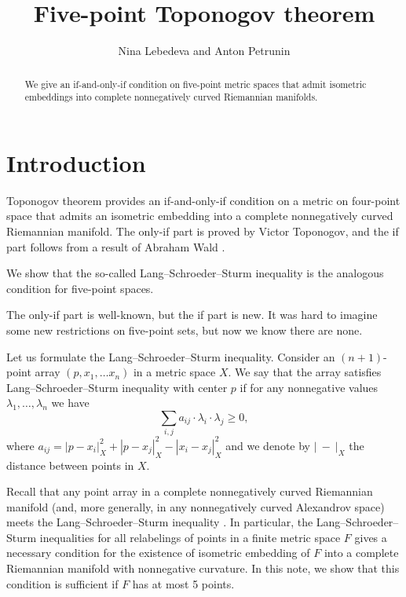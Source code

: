 \documentclass{article}
\begin{document}


\title{Five-point Toponogov theorem}
\author{Nina Lebedeva and Anton Petrunin}

\date{}
\maketitle
\begin{abstract}
We give an if-and-only-if condition on five-point metric spaces that admit isometric embeddings into complete nonnegatively curved Riemannian manifolds.
\end{abstract}


\section{Introduction}

Toponogov theorem provides an if-and-only-if condition on a metric on four-point space that admits an isometric embedding into a complete nonnegatively curved Riemannian manifold.
The only-if part is proved by Victor Toponogov, and the if part follows from a result of Abraham Wald \cite[\S 7]{wald}.

We show that the so-called Lang--Schroeder--Sturm inequality is the analogous condition for five-point spaces.
 
The only-if part is well-known, but the if part is new.
It was hard to imagine some new restrictions on five-point sets, but now we know there are none.

Let us formulate the Lang--Schroeder--Sturm inequality.
Consider an $(n+1)$-point array $(p,x_1,\dots x_n)$ in a metric space $X$.
We say that the array satisfies Lang--Schroeder--Sturm inequality with center $p$
if for any nonnegative values $\lambda_1,\dots,\lambda_n$ we have
\[\sum_{i,j}a_{ij}\cdot \lambda_i\cdot\lambda_j\ge 0,\]
where $a_{ij}=|p-x_i|_X^2+|p-x_j|_X^2-|x_i-x_j|_X^2$
and we denote by $|\ -\ |_X$ the distance between points in $X$.

Recall that any point array in a  complete nonnegatively curved Riemannian manifold (and, more generally, in any nonnegatively curved Alexandrov space) meets the Lang--Schroeder--Sturm inequality \cite{lang-schroeder, sturm}.
In particular, 
the Lang--Schroeder--Sturm inequalities for all relabelings of points in a finite metric space $F$
gives a necessary condition for the existence of isometric embedding of $F$ into a complete Riemannian manifold with nonnegative curvature.
In this note, we show that this condition is sufficient if $F$ has at most 5 points.
\end{document}

